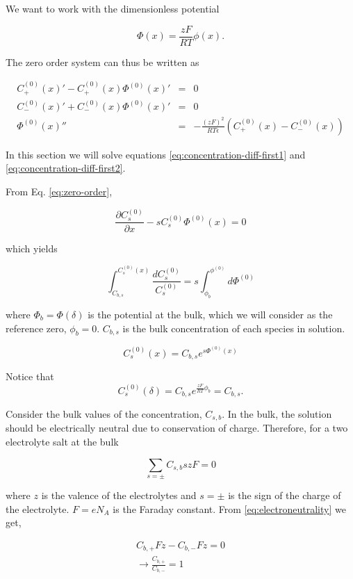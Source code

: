We want to work with the dimensionless potential 

$$\Phi(x) = \frac{zF}{RT}\phi(x).$$

The zero order system can thus be written as

\begin{eqnarray}
\label{eq:zero-order}
C^{(0)}_+(x)'-C^{(0)}_+(x)\Phi^{(0)}(x)' &=& 0\\
 C^{(0)}_-(x)'+C^{(0)}_-(x)\Phi^{(0)}(x)'&=& 0\\
\Phi^{(0)}(x) ''&=& -\frac{(zF)^2}{RT\epsilon} (C^{(0)}_{+}(x)-C^{(0)}_{-}(x))
\end{eqnarray}



In this section we will solve equations \ref{eq:concentration-diff-first1} and \ref{eq:concentration-diff-first2}. 

From Eq. \ref{eq:zero-order},

$$\frac{\partial C^{(0)}_s}{\partial x}-sC^{(0)}_s\Phi^{(0)}(x)= 0$$

which yields

$$\int_{C_{b,s}}^{C^{(0)}_s(x)} \frac{dC^{(0)}_s}{C^{(0)}_s}=s\int_{\phi_b}^{\phi^{(0)}} d\Phi^{(0)}$$

where $\Phi_b = \Phi(\delta)$ is the potential at the bulk, which we will consider as the reference zero, $\phi_b = 0$. $C_{b,s}$ is the bulk concentration of each species in solution.

$$C^{(0)}_s(x)=C_{b,s}e^{s\Phi^{(0)}(x)}$$

Notice that 
\begin{equation}
C^{(0)}_s(\delta) = C_{b,s}e^{\frac{zF}{RT}\phi_b}=C_{b,s}.
\label{eq:zero-order-sol-c}
\end{equation}

Consider the bulk values of the concentration, $C_{s,b}$. In the bulk, the solution should be electrically neutral due to conservation of charge. Therefore, for a two electrolyte salt at the bulk

\begin{equation}
\label{eq:electroneutrality}
\sum_{s=\pm} C_{s,b} sz F = 0
\end{equation}


where $z$ is the valence of the electrolytes and $s = \pm$ is the sign of the charge of the electrolyte. $F = eN_A$ is the Faraday constant. From \ref{eq:electroneutrality} we get,

\begin{eqnarray}\nonumber
C_{b,+}Fz-C_{b,-}Fz=0\\
\rightarrow \frac{C_{b,+}}{C_{b,-}}=1
\label{eq:electroneutrality2}
\end{eqnarray}

